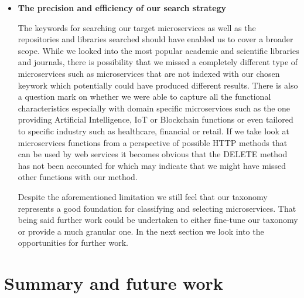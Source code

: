 \documentclass{article}
\begin{document}
\begin{itemize}
\item \textbf{The precision and efficiency of our search strategy}

The keywords for searching our target microservices as well as the repositories and libraries searched should have enabled us to cover a broader scope. While we looked into the most popular academic and scientific libraries and journals, there is possibility that we missed a completely different type of microservices such as microservices that are not indexed with our chosen keywork which potentially could have produced different results. There is also a question mark on whether we were able to capture all the functional characteristics especially with domain specific microservices such as the one providing Artificial Intelligence, IoT or Blockchain functions or even tailored to specific industry such as healthcare, financial or retail. If we take look at microservices functions from a perspective of possible HTTP methods that can be used by web services it becomes obvious that the DELETE method has not been accounted for which may indicate that we might have missed other functions with our method.

Despite the aforementioned limitation we still feel that our taxonomy represents a good foundation for classifying and selecting microservices. That being said further work could be undertaken to either fine-tune our taxonomy or provide a much granular one. In the next section we look into the opportunities for further work.

\end{itemize}

\section{Summary and future work}
\end{document}
